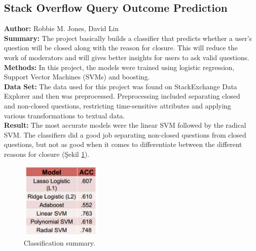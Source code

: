 \documentclass[12pt,a4paper]{article}
\begin{document}
    \subsection{Stack Overflow Query Outcome Prediction}
    \textbf{Author:} Robbie M. Jones, David Lin  \cite{sower}\\
    \textbf{Summary:} The project basically builds a classifier that predicts whether a user’s question will be closed along with
the reason for closure. This will reduce the work of moderators and will gives better insights for users to
ask valid questions. \\
    \textbf{Methods:} In this project, the models were trained using logistic regression, Support Vector Machines (SVMs) and
boosting. \\
	\textbf{Data Set:} The data used for this project was found on StackExchange Data Explorer and then was preprocessed.
Preprocessing included separating closed and non-closed questions, restricting time-sensitive attributes
and applying various transformations to textual data. \\
    \textbf{Result:} The most accurate models were the linear SVM followed by the radical SVM. The classifiers did a good
job separating non-closed questions from closed questions, but not as good when it comes to
differentiate between the different reasons for closure (Şekil \ref{fig:fig}).

    \begin{figure}
        \begin{center}
            \includegraphics[width=150px]{resimler/fig.png}
            \caption{Classification summary.}
            \label{fig:fig}
        \end{center}
    \end{figure}

    \newpage
    
    
\end{document}
